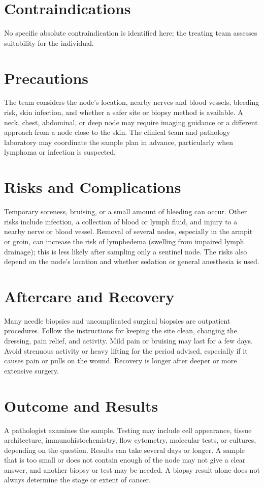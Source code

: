\section*{Contraindications}
No specific absolute contraindication is identified here; the treating team assesses suitability for the individual.

\section*{Precautions}
The team considers the node's location, nearby nerves and blood vessels, bleeding risk, skin infection, and whether a safer site or biopsy method is available. A neck, chest, abdominal, or deep node may require imaging guidance or a different approach from a node close to the skin. The clinical team and pathology laboratory may coordinate the sample plan in advance, particularly when lymphoma or infection is suspected.

\section*{Risks and Complications}
Temporary soreness, bruising, or a small amount of bleeding can occur. Other risks include infection, a collection of blood or lymph fluid, and injury to a nearby nerve or blood vessel. Removal of several nodes, especially in the armpit or groin, can increase the risk of lymphedema (swelling from impaired lymph drainage); this is less likely after sampling only a sentinel node. The risks also depend on the node's location and whether sedation or general anesthesia is used.

\section*{Aftercare and Recovery}
Many needle biopsies and uncomplicated surgical biopsies are outpatient procedures. Follow the instructions for keeping the site clean, changing the dressing, pain relief, and activity. Mild pain or bruising may last for a few days. Avoid strenuous activity or heavy lifting for the period advised, especially if it causes pain or pulls on the wound. Recovery is longer after deeper or more extensive surgery.

\section*{Outcome and Results}
A pathologist examines the sample. Testing may include cell appearance, tissue architecture, immunohistochemistry, flow cytometry, molecular tests, or cultures, depending on the question. Results can take several days or longer. A sample that is too small or does not contain enough of the node may not give a clear answer, and another biopsy or test may be needed. A biopsy result alone does not always determine the stage or extent of cancer.

